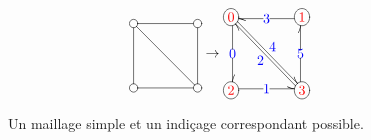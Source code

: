 \documentclass[]{article}
\begin{document}
\begin{multicols}{2}
	\begin{figure}[!h]
		\[
	\begin{aligned}[c]
		\entrymodifiers={+[o][F]}
		\renewcommand{\labelstyle}{\textstyle}
		\xymatrix@=4em @L=.25ex{
			{}
			\ar @^{-} [d]
			\ar @^{-} [dr]
			& {}
			\ar @^{-} [l]
			\\ {}
			\ar @^{-} [r]
			& {}
			\ar @^{-} [u]
		}
	\end{aligned}
	\rightarrow
	\begin{aligned}[c]
		\entrymodifiers={+[o][F]}
		\renewcommand{\labelstyle}{\textstyle}
		\xymatrix@=4em @L=.25ex{
			{\color{red}0}
			\ar @<.25ex> @^{->} [d] |{\color{blue}0}
			\ar @<.25ex> @^{->} [dr] ^{\color{blue}4}
			& {\color{red}1}
			\ar @<.25ex> @^{->} [l] |{\color{blue}3}
			\\ {\color{red}2}
			\ar @<.25ex> @^{->} [r] |{\color{blue}1}
			& {\color{red}3}
			\ar @<.25ex> @^{->} [ul] ^{\color{blue}2}
			\ar @<.25ex> @^{->} [u] |{\color{blue}5}
		}
	\end{aligned}
		\]
		\caption{Un maillage simple et un indiçage correspondant possible.}
		\label{maillage_simple}
	\end{figure}


\end{multicols}
\end{document}
